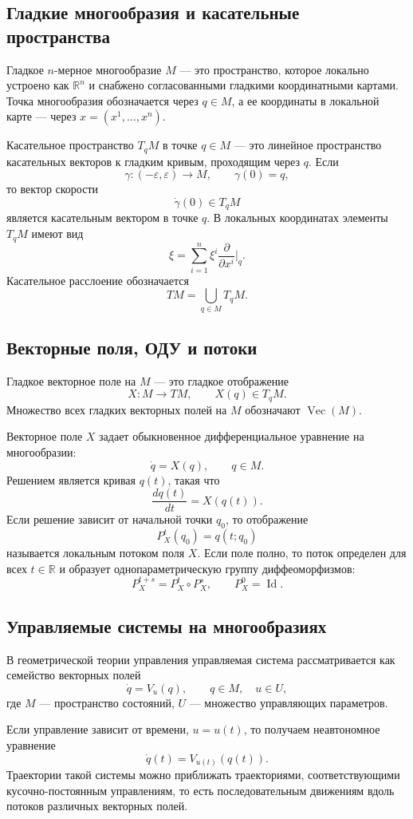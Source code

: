 \documentclass[12pt,a4paper]{article}
\newcommand{\Vect}{\operatorname{Vec}}
\begin{document}
\subsection*{Гладкие многообразия и касательные пространства}
Гладкое $n$-мерное многообразие $M$ --- это пространство, которое локально устроено как $\mathbb R^n$ и снабжено согласованными гладкими координатными картами. Точка многообразия обозначается через $q\in M$, а ее координаты в локальной карте --- через $x=(x^1,\ldots,x^n)$.

Касательное пространство $T_qM$ в точке $q\in M$ --- это линейное пространство касательных векторов к гладким кривым, проходящим через $q$. Если
\[
\gamma:(-\varepsilon,\varepsilon)\to M,\qquad \gamma(0)=q,
\]
то вектор скорости
\[
\dot\gamma(0)\in T_qM
\]
является касательным вектором в точке $q$. В локальных координатах элементы $T_qM$ имеют вид
\[
\xi=\sum_{i=1}^n \xi^i\frac{\partial}{\partial x^i}\bigg|_q.
\]
Касательное расслоение обозначается
\[
TM=\bigcup_{q\in M}T_qM.
\]

\subsection*{Векторные поля, ОДУ и потоки}
Гладкое векторное поле на $M$ --- это гладкое отображение
\[
X:M\to TM,\qquad X(q)\in T_qM.
\]
Множество всех гладких векторных полей на $M$ обозначают $\Vect(M)$.

Векторное поле $X$ задает обыкновенное дифференциальное уравнение на многообразии:
\[
\dot q=X(q),\qquad q\in M.
\]
Решением является кривая $q(t)$, такая что
\[
\frac{dq(t)}{dt}=X(q(t)).
\]
Если решение зависит от начальной точки $q_0$, то отображение
\[
P_X^t(q_0)=q(t;q_0)
\]
называется локальным потоком поля $X$. Если поле полно, то поток определен для всех $t\in\mathbb R$ и образует однопараметрическую группу диффеоморфизмов:
\[
P_X^{t+s}=P_X^t\circ P_X^s,
\qquad P_X^0=\operatorname{Id}.
\]

\subsection*{Управляемые системы на многообразиях}
В геометрической теории управления управляемая система рассматривается как семейство векторных полей
\[
\dot q=V_u(q),\qquad q\in M,\quad u\in U,
\]
где $M$ --- пространство состояний, $U$ --- множество управляющих параметров.

Если управление зависит от времени, $u=u(t)$, то получаем неавтономное уравнение
\[
\dot q(t)=V_{u(t)}(q(t)).
\]
Траектории такой системы можно приближать траекториями, соответствующими кусочно-постоянным управлениям, то есть последовательным движениям вдоль потоков различных векторных полей.
\end{document}
